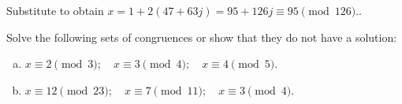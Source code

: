 Substitute to obtain $x = 1 + 2(47+ 63j) = 95 + 126j \equiv 95 \pmod{126}.$.  


\begin{exercise}{}
Solve the following sets of congruences or show that they do not have a solution:
\begin {enumerate}[(a)]
\item
$x \equiv 2 \pmod{3}; \quad x \equiv 3 \pmod{4}; \quad x \equiv 4 \pmod{5}.$
\item
$x \equiv 12 \pmod{23}; \quad x \equiv 7 \pmod{11}; \quad x \equiv 3 \pmod{4}.$
\end {enumerate}
\end {exercise}






